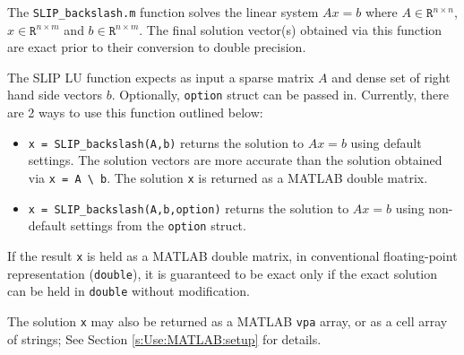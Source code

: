 \documentclass[12pt]{article}
\theoremstyle{definition}
\begin{document}
The \verb|SLIP_backslash.m| function solves the linear system $A x = b$ where
$A \in \mathtt{R}^{n \times n}$, $x \in \mathtt{R}^{n \times m}$ and $b \in
\mathtt{R}^{n \times m}$. The final solution vector(s) obtained via this
function are exact prior to their conversion to double precision.

The SLIP LU function expects as input a sparse matrix $A$ and dense set of
right hand side vectors $b$. Optionally, \verb|option| struct can be passed in.
Currently, there are 2 ways to use this function outlined below:

\begin{itemize}

\item \verb|x = SLIP_backslash(A,b)| returns the solution to $A x =
b$ using default settings. The solution vectors are more accurate than
the solution obtained via \verb|x = A \ b|.  The solution \verb|x| is
returned as a MATLAB double matrix.

\item \verb|x = SLIP_backslash(A,b,option)| returns the solution to $A x =
b$ using non-default settings from the \verb|option| struct.

\end{itemize}

If the result \verb|x| is held as a MATLAB double matrix, in conventional
floating-point representation (\verb|double|), it is guaranteed to be exact
only if the exact solution can be held in \verb|double| without modification.

The solution \verb|x| may also be returned as a MATLAB \verb|vpa| array, or as
a cell array of strings; See Section \ref{s:Use:MATLAB:setup} for details.


\newpage


\end{document}
